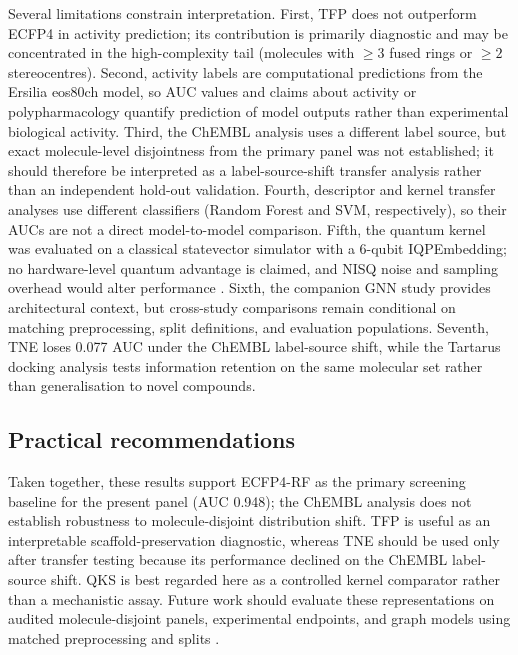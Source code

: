 \documentclass[11pt,a4paper]{article}
\begin{document}
Several limitations constrain interpretation. First, TFP does not outperform ECFP4 in activity prediction; its contribution is primarily diagnostic and may be concentrated in the high-complexity tail (molecules with $\geq 3$ fused rings or $\geq 2$ stereocentres). Second, activity labels are computational predictions from the Ersilia eos80ch model, so AUC values and claims about activity or polypharmacology quantify prediction of model outputs rather than experimental biological activity. Third, the ChEMBL analysis uses a different label source, but exact molecule-level disjointness from the primary panel was not established; it should therefore be interpreted as a label-source-shift transfer analysis rather than an independent hold-out validation. Fourth, descriptor and kernel transfer analyses use different classifiers (Random Forest and SVM, respectively), so their AUCs are not a direct model-to-model comparison. Fifth, the quantum kernel was evaluated on a classical statevector simulator with a 6-qubit IQPEmbedding; no hardware-level quantum advantage is claimed, and NISQ noise and sampling overhead would alter performance \citep{preskill2018nisq}. Sixth, the companion GNN study \citep{temgoua2027gnn} provides architectural context, but cross-study comparisons remain conditional on matching preprocessing, split definitions, and evaluation populations. Seventh, TNE loses \num{0.077} AUC under the ChEMBL label-source shift, while the Tartarus docking analysis tests information retention on the same molecular set rather than generalisation to novel compounds.

\subsection{Practical recommendations}

Taken together, these results support ECFP4-RF as the primary screening baseline for the present panel (AUC \num{0.948}); the ChEMBL analysis does not establish robustness to molecule-disjoint distribution shift. TFP is useful as an interpretable scaffold-preservation diagnostic, whereas TNE should be used only after transfer testing because its performance declined on the ChEMBL label-source shift. QKS is best regarded here as a controlled kernel comparator rather than a mechanistic assay. Future work should evaluate these representations on audited molecule-disjoint panels, experimental endpoints, and graph models using matched preprocessing and splits \citep{topologynet_2018}.

\end{document}
